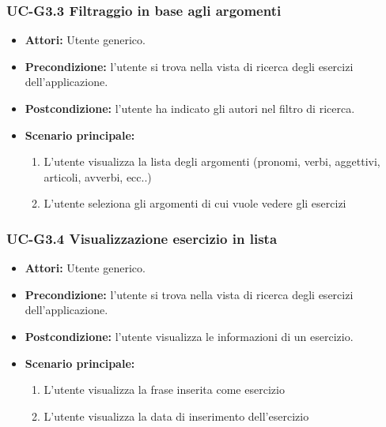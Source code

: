 	\subsubsection{UC-G3.3 Filtraggio in base agli argomenti}
		\begin{itemize}
			\item \textbf{Attori:} Utente generico.
			\item \textbf{Precondizione: } l'utente si trova nella vista di ricerca degli esercizi dell'applicazione.
			\item \textbf{Postcondizione: } l'utente ha indicato gli autori nel filtro di ricerca.
			\item \textbf{Scenario principale:}
			\begin{enumerate}
				\item L'utente visualizza la lista degli argomenti (pronomi, verbi, aggettivi, articoli, avverbi, ecc..)
				\item L'utente seleziona gli argomenti di cui vuole vedere gli esercizi
			\end{enumerate}
		\end{itemize}
		
\subsubsection{UC-G3.4 Visualizzazione esercizio in lista}
		\begin{itemize}
			\item \textbf{Attori:} Utente generico.
			\item \textbf{Precondizione: } l'utente si trova nella vista di ricerca degli esercizi dell'applicazione.
			\item \textbf{Postcondizione: } l'utente visualizza le informazioni di un esercizio.
			\item \textbf{Scenario principale:}
			\begin{enumerate}
				\item L'utente visualizza la frase inserita come esercizio
				\item L'utente visualizza la data di inserimento dell'esercizio
			\end{enumerate}
		\end{itemize}


